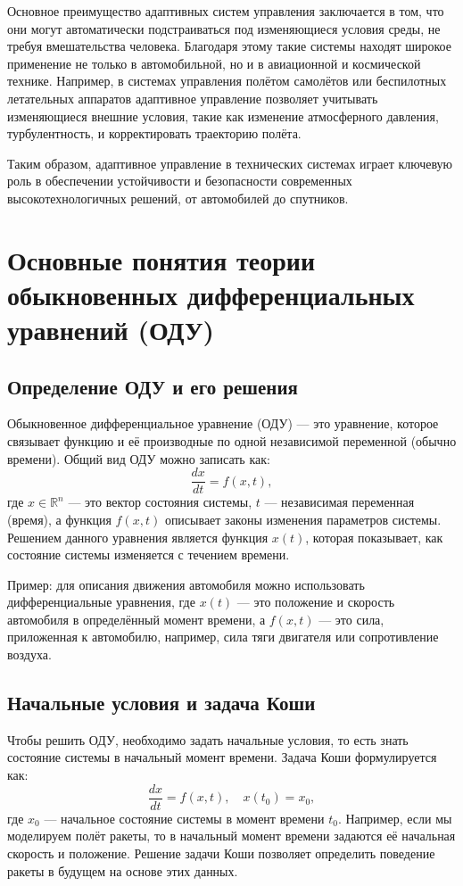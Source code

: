\documentclass[a4paper,14pt]{extarticle} %
\begin{document}
Основное преимущество адаптивных систем управления заключается в том, что они могут автоматически подстраиваться под изменяющиеся условия среды, не требуя вмешательства человека. Благодаря этому такие системы находят широкое применение не только в автомобильной, но и в авиационной и космической технике. Например, в системах управления полётом самолётов или беспилотных летательных аппаратов адаптивное управление позволяет учитывать изменяющиеся внешние условия, такие как изменение атмосферного давления, турбулентность, и корректировать траекторию полёта.

Таким образом, адаптивное управление в технических системах играет ключевую роль в обеспечении устойчивости и безопасности современных высокотехнологичных решений, от автомобилей до спутников.

\newpage

\section{Основные понятия теории обыкновенных дифференциальных уравнений (ОДУ)}

\subsection{Определение ОДУ и его решения}
Обыкновенное дифференциальное уравнение (ОДУ) — это уравнение, которое связывает функцию и её производные по одной независимой переменной (обычно времени). Общий вид ОДУ можно записать как:
\[
\frac{dx}{dt} = f(x, t),
\]
где \(x \in \mathbb{R}^n\) — это вектор состояния системы, \(t\) — независимая переменная (время), а функция \(f(x, t)\) описывает законы изменения параметров системы. Решением данного уравнения является функция \(x(t)\), которая показывает, как состояние системы изменяется с течением времени.

Пример: для описания движения автомобиля можно использовать дифференциальные уравнения, где \(x(t)\) — это положение и скорость автомобиля в определённый момент времени, а \(f(x, t)\) — это сила, приложенная к автомобилю, например, сила тяги двигателя или сопротивление воздуха.

\subsection{Начальные условия и задача Коши}
Чтобы решить ОДУ, необходимо задать начальные условия, то есть знать состояние системы в начальный момент времени. Задача Коши формулируется как:
\[
\frac{dx}{dt} = f(x, t), \quad x(t_0) = x_0,
\]
где \(x_0\) — начальное состояние системы в момент времени \(t_0\). Например, если мы моделируем полёт ракеты, то в начальный момент времени задаются её начальная скорость и положение. Решение задачи Коши позволяет определить поведение ракеты в будущем на основе этих данных.
\end{document}
